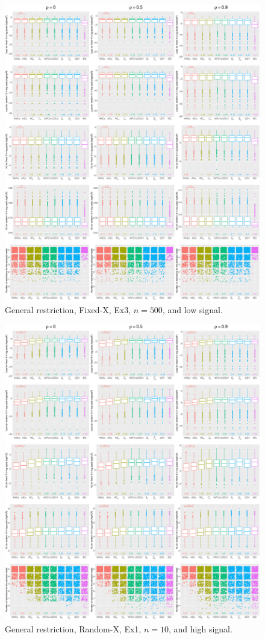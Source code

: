 \begin{figure}[!ht]
\centering
\includegraphics[width=\textwidth]{figures/supplement/fixedx/general_restriction/Ex3_n500_lsnr.eps}
\caption{General restriction, Fixed-X, Ex3, $n=500$, and low signal.}
\end{figure}
\clearpage
\begin{figure}[!ht]
\centering
\includegraphics[width=\textwidth]{figures/supplement/randomx/general_restriction/Ex1_n10_hsnr.eps}
\caption{General restriction, Random-X, Ex1, $n=10$, and high signal.}
\end{figure}
